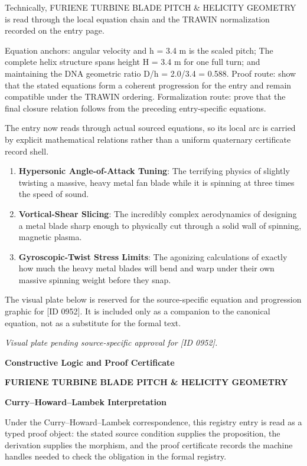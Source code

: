Technically, FURIENE TURBINE BLADE PITCH \& HELICITY GEOMETRY is read through the local equation chain and the TRAWIN normalization recorded on the entry page.

Equation anchors: angular velocity and h = 3.4 m is the scaled pitch; The complete helix structure spans height H = 3.4 m for one full turn; and maintaining the DNA geometric ratio D/h = 2.0/3.4 = 0.588. Proof route: show that the stated equations form a coherent progression for the entry and remain compatible under the TRAWIN ordering. Formalization route: prove that the final closure relation follows from the preceding entry-specific equations.

The entry now reads through actual sourced equations, so its local arc is carried by explicit mathematical relations rather than a uniform quaternary certificate record shell.
\endgroup

\begin{enumerate}[leftmargin=1.6em,itemsep=6pt,topsep=4pt]
\item \textbf{Hypersonic Angle-of-Attack Tuning}: The terrifying physics of slightly twisting a massive, heavy metal fan blade while it is spinning at three times the speed of sound.
\item \textbf{Vortical-Shear Slicing}: The incredibly complex aerodynamics of designing a metal blade sharp enough to physically cut through a solid wall of spinning, magnetic plasma.
\item \textbf{Gyroscopic-Twist Stress Limits}: The agonizing calculations of exactly how much the heavy metal blades will bend and warp under their own massive spinning weight before they snap.
\end{enumerate}

\begingroup\footnotesize\sloppy
The visual plate below is reserved for the source-specific equation and progression graphic for [ID 0952]. It is included only as a companion to the canonical equation, not as a substitute for the formal text.
\par\endgroup
\begingroup\footnotesize\itshape
Visual plate pending source-specific approval for [ID 0952].
\par\endgroup

\clearpage
\begingroup\tzpsupportsetup
\noindent\textbf{\fontsize{10.8pt}{12.8pt}\selectfont [ID 0952] Constructive Logic and Proof Certificate}\par
\noindent\textbf{\fontsize{10pt}{12pt}\selectfont FURIENE TURBINE BLADE PITCH \& HELICITY GEOMETRY}\par
\vspace{0.45em}
\begingroup
\footnotesize
\setlength{\parskip}{0.22em}
\setlength{\parindent}{0pt}
\noindent\textbf{Curry--Howard--Lambek Interpretation}\par
Under the Curry--Howard--Lambek correspondence, this registry entry is read as a typed proof
object: the stated source condition supplies the proposition, the derivation supplies the
morphism, and the proof certificate records the machine handles needed to check the obligation
in the formal registry.

